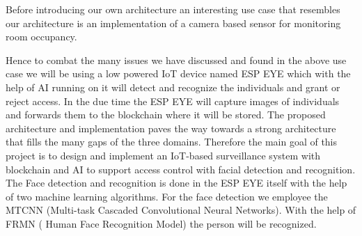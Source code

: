 Before introducing our own architecture an interesting use case that resembles  our architecture is an implementation of a camera based sensor for monitoring room occupancy. 

Hence to combat the many issues we have discussed and found in the above use case we will be using a low powered IoT device named ESP EYE which with the help of AI running on it will detect and recognize the individuals and grant or reject access. In the due time the ESP EYE will capture images of individuals and forwards them to the blockchain where it will be stored. The proposed architecture and implementation paves the way towards a strong architecture that fills the many gaps of the three domains. Therefore the main goal of this project is to design and implement an IoT-based surveillance system with blockchain and AI to support access control with facial detection and recognition. 
The Face detection and recognition is done in the ESP EYE itself with the help of two machine learning algorithms. For the face detection we employee the MTCNN (Multi-task Cascaded Convolutional Neural Networks). With the help of FRMN ( Human Face Recognition Model) the person will be recognized. 







 
 


